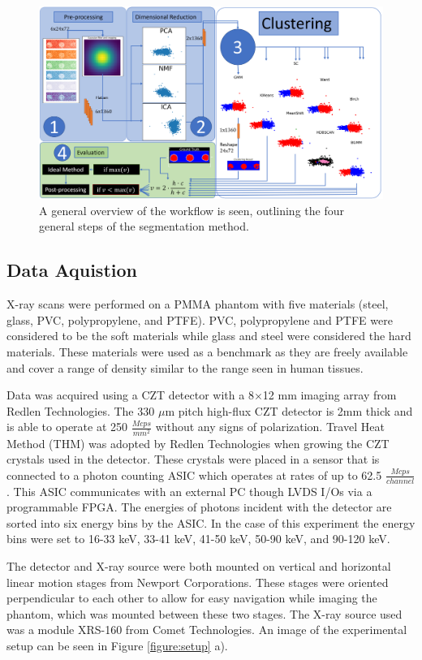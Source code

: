 \documentclass[a4paper,11pt]{article}
\begin{document}
\begin{figure}[htbp]

\includegraphics[width=\textwidth]{figures/flow_chart.png}

\caption{A general overview of the workflow is seen, outlining the four general steps of the segmentation method.}
\label{overview}
\end{figure}

\subsection{Data Aquistion}
X-ray scans were performed on a PMMA phantom with five materials (steel, glass, PVC, polypropylene, and PTFE). PVC, polypropylene and PTFE were considered to be the soft materials while glass and steel were considered the hard materials. These materials were used as a benchmark as they are freely available and cover a range of density similar to the range seen in human tissues.

Data was acquired using a CZT detector with a 8$\times$12 mm imaging array from Redlen Technologies. The 330 $\mu$m pitch high-flux CZT detector is 2mm thick and is able to operate at 250 $\frac{Mcps}{mm^2}$ without any signs of polarization. Travel Heat Method (THM) was adopted by Redlen Technologies when growing the CZT crystals used in the detector. These crystals were placed in a sensor that is connected to a photon counting ASIC which operates at rates of up to 62.5 $\frac{Mcps}{channel}$. This ASIC communicates with an external PC though LVDS I/Os via a programmable FPGA. The energies of photons incident with the detector are sorted into six energy bins by the ASIC. In the case of this experiment the energy bins were set to 16-33 keV, 33-41 keV, 41-50 keV, 50-90 keV, and 90-120 keV.

The detector and X-ray source were both mounted on vertical and horizontal linear motion stages from Newport Corporations. These stages were oriented perpendicular to each other to allow for easy navigation while imaging the phantom, which was mounted between these two stages. The X-ray source used was a module XRS-160 from Comet Technologies. An image of the experimental setup can be seen in Figure \ref{figure:setup} a). 
\end{document}
